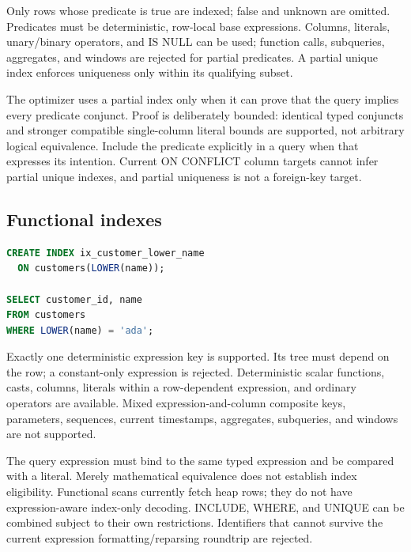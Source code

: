 Only rows whose predicate is true are indexed; false and unknown are omitted. Predicates must be deterministic, row-local base expressions. Columns, literals, unary/binary operators, and IS NULL can be used; function calls, subqueries, aggregates, and windows are rejected for partial predicates. A partial unique index enforces uniqueness only within its qualifying subset.

The optimizer uses a partial index only when it can prove that the query implies every predicate conjunct. Proof is deliberately bounded: identical typed conjuncts and stronger compatible single-column literal bounds are supported, not arbitrary logical equivalence. Include the predicate explicitly in a query when that expresses its intention. Current ON CONFLICT column targets cannot infer partial unique indexes, and partial uniqueness is not a foreign-key target.

\subsection{Functional indexes}

\begin{lstlisting}[language=SQL]
CREATE INDEX ix_customer_lower_name
  ON customers(LOWER(name));

SELECT customer_id, name
FROM customers
WHERE LOWER(name) = 'ada';
\end{lstlisting}

Exactly one deterministic expression key is supported. Its tree must depend on the row; a constant-only expression is rejected. Deterministic scalar functions, casts, columns, literals within a row-dependent expression, and ordinary operators are available. Mixed expression-and-column composite keys, parameters, sequences, current timestamps, aggregates, subqueries, and windows are not supported.

The query expression must bind to the same typed expression and be compared with a literal. Merely mathematical equivalence does not establish index eligibility. Functional scans currently fetch heap rows; they do not have expression-aware index-only decoding. INCLUDE, WHERE, and UNIQUE can be combined subject to their own restrictions. Identifiers that cannot survive the current expression formatting/reparsing roundtrip are rejected.


